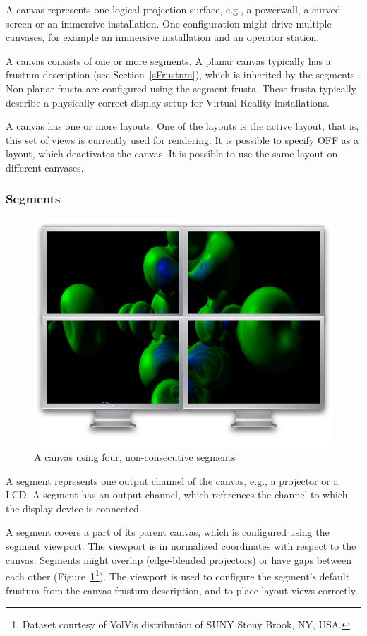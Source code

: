 \documentclass[10pt,a4]{scrartcl}
\newcommand{\fig}[1]{Figure~\ref{#1}}
\newcommand{\sref}[1]{Section~\ref{#1}}
\begin{document}
A canvas represents one logical projection surface, e.g., a powerwall, a
curved screen or an immersive installation. One configuration might
drive multiple canvases, for example an immersive installation and an
operator station.

A canvas consists of one or more segments. A planar canvas typically has
a frustum description (see \sref{sFrustum}), which is inherited by the
segments. Non-planar frusta are configured using the segment
frusta. These frusta typically describe a physically-correct display
setup for Virtual Reality installations.

A canvas has one or more layouts. One of the layouts is the active
layout, that is, this set of views is currently used for rendering. It
is possible to specify \textsf{OFF} as a layout, which deactivates the
canvas. It is possible to use the same layout on different canvases.

\subsubsection{Segments}

\begin{figure}
  \includegraphics[width=.382\textwidth]{images/canvas.pdf}
  {\caption{\label{fCanvas}A canvas using four, non-consecutive segments}}
\end{figure}
A segment represents one output channel of the canvas, e.g., a projector
or a LCD. A segment has an output channel, which references the channel to
which the display device is connected.

A segment covers a part of its parent canvas, which is configured using
the segment viewport. The viewport is in normalized coordinates with
respect to the canvas. Segments might overlap (edge-blended projectors)
or have gaps between each other (\fig{fCanvas}\footnote{Dataset courtesy
  of VolVis distribution of SUNY Stony Brook, NY, USA.}). The viewport
is used to configure the segment's default frustum from the canvas
frustum description, and to place layout views correctly.
\end{document}

